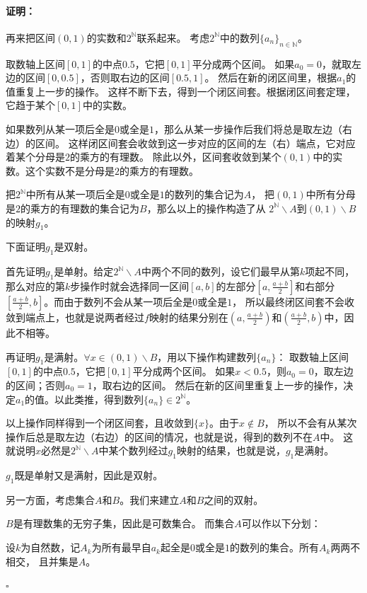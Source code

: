 \documentclass[12pt,UTF8]{ctexbook}
\renewenvironment{proof}{\paragraph{\textbf{证明：}}}{\hfill$\square$}
\begin{document}
\begin{appendix}
\begin{proof}
    再来把区间$(0,1)$的实数和$2^\mathbb{N}$联系起来。
    考虑$2^\mathbb{N}$中的数列$\{a_n\}_{n\in\mathbb{N}}$。

    取数轴上区间$[0,1]$的中点$0.5$，它把$[0,1]$平分成两个区间。
    如果$a_0 = 0$，就取左边的区间$[0,0.5]$，否则取右边的区间$[0.5,1]$。
    然后在新的闭区间里，根据$a_1$的值重复上一步的操作。
    这样不断下去，得到一个闭区间套。根据闭区间套定理，它趋于某个$[0,1]$中的实数。

    如果数列从某一项后全是$0$或全是$1$，那么从某一步操作后我们将总是取左边（右边）的区间。
    这样闭区间套会收敛到这一步对应的区间的左（右）端点，它对应着某个分母是$2$的乘方的有理数。
    除此以外，区间套收敛到某个$(0,1)$中的实数。这个实数不是分母是$2$的乘方的有理数。

    把$2^\mathbb{N}$中所有从某一项后全是$0$或全是$1$的数列的集合记为$A$，
    把$(0,1)$中所有分母是$2$的乘方的有理数的集合记为$B$，那么以上的操作构造了从
    $2^\mathbb{N}\backslash A$到$(0,1)\backslash B$的映射$g_1$。

    下面证明$g_1$是双射。

    首先证明$g_1$是单射。给定$2^\mathbb{N}\backslash A$中两个不同的数列，设它们最早从第$k$项起不同，
    那么对应的第$k$步操作时就会选择同一区间$[a,b]$的左部分$[a,\frac{a+b}{2}]$和右部分$[\frac{a+b}{2},b]$。而由于数列不会从某一项后全是$0$或全是$1$，
    所以最终闭区间套不会收敛到端点上，也就是说两者经过$f$映射的结果分别在$(a,\frac{a+b}{2})$和$(\frac{a+b}{2},b)$中，因此不相等。

    再证明$g_1$是满射。$\forall x \in (0,1)\backslash B$，用以下操作构建数列$\{a_n\}$：
    取数轴上区间$[0,1]$的中点$0.5$，它把$[0,1]$平分成两个区间。
    如果$x<0.5$，则$a_0=0$，取左边的区间；否则$a_0=1$，取右边的区间。
    然后在新的区间里重复上一步的操作，决定$a_1$的值。以此类推，得到数列$\{a_n\}\in 2^\mathbb{N}$。

    以上操作同样得到一个闭区间套，且收敛到$\{x\}$。由于$x\notin B$，
    所以不会有从某次操作后总是取左边（右边）的区间的情况，也就是说，得到的数列不在$A$中。
    这就说明$x$必然是$2^\mathbb{N}\backslash A$中某个数列经过$g_1$映射的结果，也就是说，$g_1$是满射。
    
    $g_1$既是单射又是满射，因此是双射。

    另一方面，考虑集合$A$和$B$。我们来建立$A$和$B$之间的双射。
    
    $B$是有理数集的无穷子集，因此是可数集合。
    而集合$A$可以作以下分划：

    设$k$为自然数，记$A_k$为所有最早自$a_k$起全是$0$或全是$1$的数列的集合。所有$A_k$两两不相交，
    且并集是$A$。


\end{proof}
\end{appendix}
\end{document}
